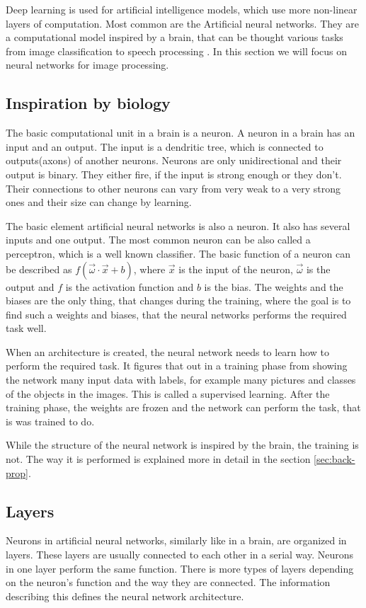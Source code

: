 \documentclass[a4paper,12pt,titlepage]{article}
\numberwithin{figure}{section}
\begin{document}
Deep learning is used for artificial intelligence models, which use more non-linear layers of computation. Most common are the Artificial neural networks. They are a computational model inspired by a brain, that can be thought various tasks from image classification \cite{szegedy2016rethinking} to speech processing \cite{graves2013speech}. In this section we will focus on neural networks for image processing.

\subsection{Inspiration by biology}
The basic computational unit in a brain is a neuron. A neuron in a brain has an input and an output. The input is a dendritic tree, which is connected to outputs(axons) of another neurons. Neurons are only unidirectional and their output is binary. They either fire, if the input is strong enough or they don't. Their connections to other neurons can vary from very weak to a very strong ones and their size can change by learning.

The basic element artificial neural networks is also a neuron. It also has several inputs and one output. The most common neuron can be also called a perceptron\cite{rosenblatt1958perceptron}, which is a well known classifier. The basic function of a neuron can be described as $f(\overrightarrow{\omega} \cdot \overrightarrow{x} + b)$, where $\overrightarrow{x}$ is the input of the neuron, $\overrightarrow{\omega}$ is the output and $f$ is the activation function and $b$ is the bias. The weights and the biases are the only thing, that changes during the training, where the goal is to find such a weights and biases, that the neural networks performs the required task well.

When an architecture is created, the neural network needs to learn how to perform the required task. It figures that out in a training phase from showing the network many input data with labels, for example many pictures and classes of the objects in the images. This is called a supervised learning. After the training phase, the weights are frozen and the network can perform the task, that is was trained to do.

While the structure of the neural network is inspired by the brain, the training is not. The way it is performed is explained more in detail in the section \ref{sec:back-prop}.

\subsection{Layers}
Neurons in artificial neural networks, similarly like in a brain, are organized in layers. These layers are usually connected to each other in a serial way. Neurons in one layer perform the same function. There is more types of layers depending on the neuron's function and the way they are connected. The information describing this defines the neural network architecture.
\end{document}
